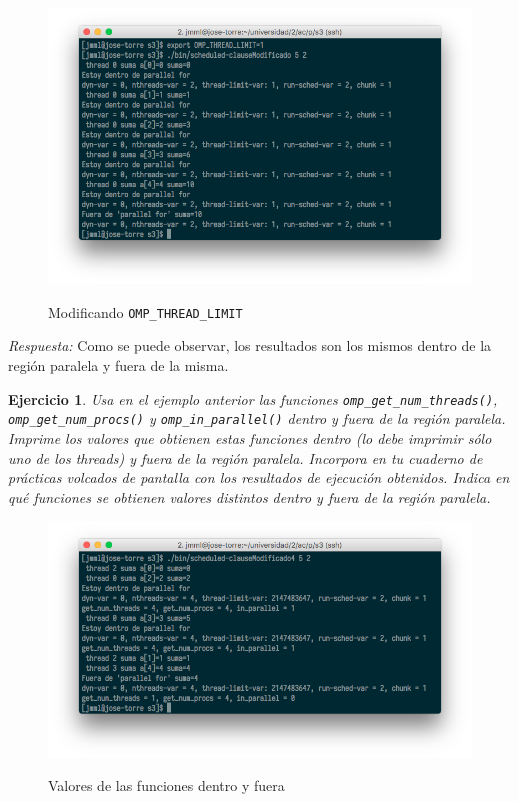\documentclass[11pt]{article}
\theoremstyle{definition-style}
\newtheorem{ejer}{Ejercicio}
\begin{document}
\begin{figure}[H]
    \centering
    \caption{Modificando \texttt{OMP\_THREAD\_LIMIT}}
    \includegraphics[width=0.9\linewidth]{./img/33.png}
    \label{fig:}
\end{figure}

\emph{Respuesta:} Como se puede observar, los resultados son los mismos dentro de la región paralela y fuera de la misma.

\begin{ejer}
    Usa en el ejemplo anterior las funciones \texttt{omp\_get\_num\_threads()}, \\ \texttt{omp\_get\_num\_procs()} y \texttt{omp\_in\_parallel()} dentro y fuera de la región paralela. Imprime los valores que obtienen estas funciones dentro (lo debe imprimir sólo uno de los threads) y fuera de la región paralela. Incorpora en tu cuaderno de prácticas volcados de pantalla con los resultados de ejecución obtenidos. Indica en qué funciones se obtienen valores distintos dentro y fuera de la región paralela.
\end{ejer}



\begin{figure}[H]
    \centering
    \caption{Valores de las funciones dentro y fuera}
    \includegraphics[width=0.9\linewidth]{./img/41.png}
    \label{fig:}
\end{figure}
\end{document}
